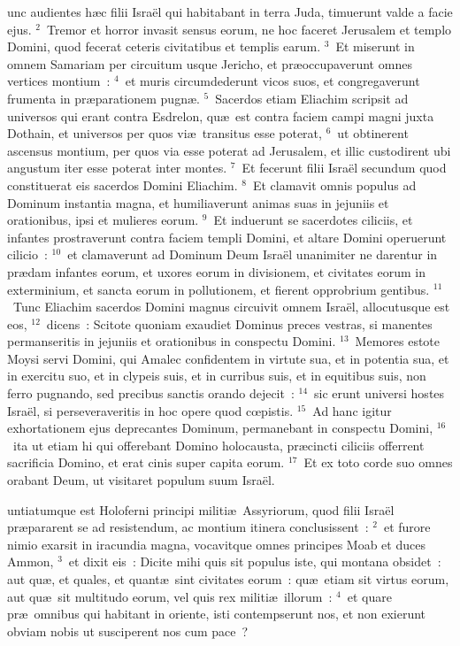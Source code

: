 \bchapter
{}unc audientes h\ae c filii Isra\"el qui habitabant in terra Juda, timuerunt valde a facie ejus.
${}^{2}$~Tremor et horror invasit sensus eorum, ne hoc faceret Jerusalem et templo Domini, quod fecerat ceteris civitatibus et templis earum.
${}^{3}$~Et miserunt in omnem Samariam per circuitum usque Jericho, et pr\ae occupaverunt omnes vertices montium~:
${}^{4}$~et muris circumdederunt vicos suos, et congregaverunt frumenta in pr\ae parationem pugn\ae .
${}^{5}$~Sacerdos etiam Eliachim scripsit ad universos qui erant contra Esdrelon, qu\ae\ est contra faciem campi magni juxta Dothain, et universos per quos vi\ae\ transitus esse poterat,
${}^{6}$~ut obtinerent ascensus montium, per quos via esse poterat ad Jerusalem, et illic custodirent ubi angustum iter esse poterat inter montes.
${}^{7}$~Et fecerunt filii Isra\"el secundum quod constituerat eis sacerdos Domini Eliachim.
${}^{8}$~Et clamavit omnis populus ad Dominum instantia magna, et humiliaverunt animas suas in jejuniis et orationibus, ipsi et mulieres eorum.
${}^{9}$~Et induerunt se sacerdotes ciliciis, et infantes prostraverunt contra faciem templi Domini, et altare Domini operuerunt cilicio~:
${}^{10}$~et clamaverunt ad Dominum Deum Isra\"el unanimiter ne darentur in pr\ae dam infantes eorum, et uxores eorum in divisionem, et civitates eorum in exterminium, et sancta eorum in pollutionem, et fierent opprobrium gentibus.
${}^{11}$~Tunc Eliachim sacerdos Domini magnus circuivit omnem Isra\"el, allocutusque est eos,
${}^{12}$~dicens~: Scitote quoniam exaudiet Dominus preces vestras, si manentes permanseritis in jejuniis et orationibus in conspectu Domini.
${}^{13}$~Memores estote Moysi servi Domini, qui Amalec confidentem in virtute sua, et in potentia sua, et in exercitu suo, et in clypeis suis, et in curribus suis, et in equitibus suis, non ferro pugnando, sed precibus sanctis orando dejecit~:
${}^{14}$~sic erunt universi hostes Isra\"el, si perseveraveritis in hoc opere quod cœpistis.
${}^{15}$~Ad hanc igitur exhortationem ejus deprecantes Dominum, permanebant in conspectu Domini,
${}^{16}$~ita ut etiam hi qui offerebant Domino holocausta, pr\ae cincti ciliciis offerrent sacrificia Domino, et erat cinis super capita eorum.
${}^{17}$~Et ex toto corde suo omnes orabant Deum, ut visitaret populum suum Isra\"el.

\bchapter
{}untiatumque est Holoferni principi militi\ae\ Assyriorum, quod filii Isra\"el pr\ae pararent se ad resistendum, ac montium itinera conclusissent~:
${}^{2}$~et furore nimio exarsit in iracundia magna, vocavitque omnes principes Moab et duces Ammon,
${}^{3}$~et dixit eis~: Dicite mihi quis sit populus iste, qui montana obsidet~: aut qu\ae , et quales, et quant\ae\ sint civitates eorum~: qu\ae\ etiam sit virtus eorum, aut qu\ae\ sit multitudo eorum, vel quis rex militi\ae\ illorum~:
${}^{4}$~et quare pr\ae\ omnibus qui habitant in oriente, isti contempserunt nos, et non exierunt obviam nobis ut susciperent nos cum pace~?


